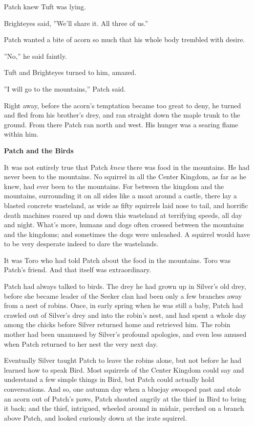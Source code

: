 \documentclass[11pt]{article}
\begin{document}
Patch knew Tuft was lying.\par
 Brighteyes said, ''We'll share it. All three of us.''\par
 Patch wanted a bite of acorn so much that his whole body trembled with desire.\par
''No,'' he said faintly.\par
 Tuft and Brighteyes turned to him, amazed.\par
 ''I will go to the mountains,'' Patch said.\par
Right away, before the acorn's temptation became too great to deny, he turned and fled from his brother's drey, and ran straight down the maple trunk to the ground. From there Patch ran north and west. His hunger was a searing flame within him.\par
\par
{\bf Patch and the Birds\par
}\par
 It was not entirely true that Patch {\it knew} there was food in the mountains. He had never been to the mountains. No squirrel in all the Center Kingdom, as far as he knew, had ever been to the mountains. For between the kingdom and the mountains, surrounding it on all sides like a moat around a castle, there lay a blasted concrete wasteland, as wide as fifty squirrels laid nose to tail, and horrific death machines roared up and down this wasteland at terrifying speeds, all day and night. What's more, humans and dogs often crossed between the mountains and the kingdoms; and sometimes the dogs were unleashed. A squirrel would have to be very desperate indeed to dare the wastelands.\par
 It was Toro who had told Patch about the food in the mountains. Toro was Patch's friend. And that itself was extraordinary.\par
 Patch had always talked to birds. The drey he had grown up in %
 Silver's old drey, before she became leader of the Seeker clan %
 had been only a few branches away from a nest of robins. Once, in early spring when he was still a baby, Patch had crawled out of Silver's drey and into the robin's nest, and had spent a whole day among the chicks before Silver returned home and retrieved him. The robin mother had been unamused by Silver's profound apologies, and even less amused when Patch returned to her nest the very next day.\par
Eventually Silver taught Patch to leave the robins alone, but not before he had learned how to speak Bird. Most squirrels of the Center Kingdom could say and understand a few simple things in Bird, but Patch could actually hold conversations. And so, one autumn day when a bluejay swooped past and stole an acorn out of Patch's paws, Patch shouted angrily at the thief in Bird to bring it back; and the thief, intrigued, wheeled around in midair, perched on a branch above Patch, and looked curiously down at the irate squirrel.\par
\end{document}
